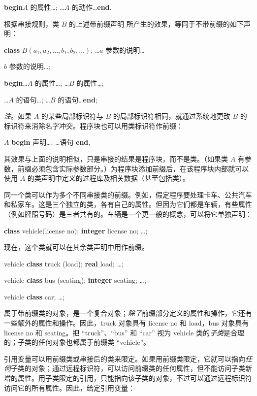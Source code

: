 \quad \quad \textbf{begin}\quad $A$ 的属性\dots; \dots $A$ 的动作\dots \textbf{end}.

根据串接规则，类 $B$ 的上述带前缀声明
所产生的效果，等同于不带前缀的如下声明：

\quad \textbf{class} $B(a_1, a_2, \dots, b_1, b_2, \dots)$; \dots $a$ 参数的说明\dots

\quad \quad \quad $b$ 参数的说明\dots;

\quad \quad \textbf{begin}\dots $A$ 的属性\dots; \dots $B$ 的属性\dots;

\tabto*{5.9em}\dots $A$ 的语句\dots; \dots $B$ 的语句\dots \textbf{end};

\textit{注}。如果 $A$ 的某些局部标识符与 $B$ 的局部标识符相同，就通过系统地更改 $B$ 的标识符来消除名字冲突。程序块也可以用类标识符作前缀：

\quad $A$ \textbf{begin} 声明\dots; \dots 语句 \textbf{end},

\noindent
其效果与上面的说明相似，只是串接的结果是程序块，而不是类。（如果类 $A$ 有参数，前缀必须包含实际参数部分。）为程序块添加前缀后，在该程序块内部就可以使用 $A$ 的类声明中定义的过程库及相关数据（甚至包括类）。

同一个类可以作为多个不同串接类的前缀。例如，假定程序要处理卡车、公共汽车和私家车。这是三个独立的类，各有自己的属性。但因为它们都是车辆，有些属性（例如牌照号码）是三者共有的。车辆是一个更一般的概念，可以将它单独声明：

\quad \textbf{class} vehicle$($license no$)$; \textbf{integer} license no; \dots;

\noindent
现在，这个类就可以在其余类声明中用作前缀。

\quad vehicle \textbf{class} truck (load); \textbf{real} load; \dots;

\quad vehicle \textbf{class} bus (seating); \textbf{integer} seating; \dots;

\quad vehicle \textbf{class} car; \dots;

属于带前缀类的对象，是一个复合对象；\textit{除了}前缀部分定义的属性和操作，它还有一些额外的属性和操作。因此，truck 对象具有 license no 和 load，bus 对象具有 license no 和 seating。把 ``truck''、``bus'' 和 ``car'' 视为 vehicle 类的\textit{子类}是合理的；子类的任何对象也都属于前缀类 ``vehicle''。

引用变量可以用前缀类或串接后的类来限定。如果用前缀类限定，它就可以指向\textit{任何}子类的对象；通过远程标识符，可以访问前缀类的任何属性，但不能访问子类新增的属性。用子类限定的引用，只能指向该子类的对象，不过可以通过远程标识符访问它的所有属性。因此，给定引用变量：

